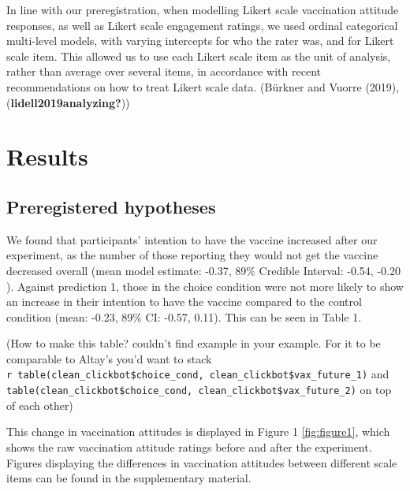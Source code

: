 \documentclass[
  english,
  ,jou,floatsintext]{apa6}
\begin{document}
In line with our preregistration, when modelling Likert scale vaccination attitude responses, as well as Likert scale engagement ratings, we used ordinal categorical multi-level models, with varying intercepts for who the rater was, and for Likert scale item. This allowed us to use each Likert scale item as the unit of analysis, rather than average over several items, in accordance with recent recommendations on how to treat Likert scale data. (Bürkner and Vuorre (2019), (\textbf{lidell2019analyzing?}))

\hypertarget{results}{%
\section{Results}\label{results}}

\hypertarget{preregistered-hypotheses-1}{%
\subsection{Preregistered hypotheses}\label{preregistered-hypotheses-1}}

We found that participants' intention to have the vaccine increased after our experiment, as the number of those reporting they would not get the vaccine decreased overall (mean model estimate: -0.37, 89\% Credible Interval: -0.54, -0.20 ). Against prediction 1, those in the choice condition were not more likely to show an increase in their intention to have the vaccine compared to the control condition (mean: -0.23, 89\% CI: -0.57, 0.11). This can be seen in Table 1.

(How to make this table? couldn't find example in your example. For it to be comparable to Altay's you'd want to stack \texttt{r\ table(clean\_clickbot\$choice\_cond,\ clean\_clickbot\$vax\_future\_1)} and \texttt{table(clean\_clickbot\$choice\_cond,\ clean\_clickbot\$vax\_future\_2)} on top of each other)

This change in vaccination attitudes is displayed in Figure 1 \ref{fig:figure1}, which shows the raw vaccination attitude ratings before and after the experiment. Figures displaying the differences in vaccination attitudes between different scale items can be found in the supplementary material.
\end{document}
